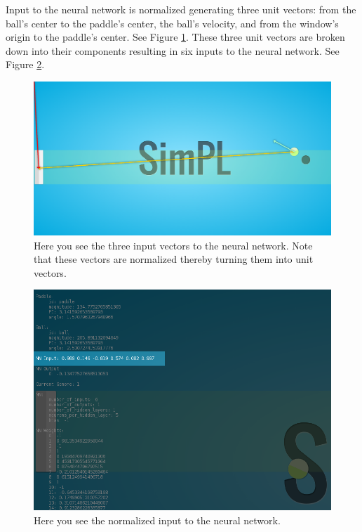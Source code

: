 \documentclass[a4paper,10pt]{article}
\begin{document}
Input to the neural network is normalized generating three unit vectors: from the ball's center to the paddle's center, the ball's velocity, and from the window's origin to the paddle's center. See Figure \ref{fig:unit_vectors}. These three unit vectors are broken down into their components resulting in six inputs to the neural network. See Figure \ref{fig:nn_input}. 

\begin{figure}[H]  
  \centering
  \includegraphics[width=1\textwidth]{figures/unit_vectors.png}
  \caption{Here you see the three input vectors to the neural network. Note that these vectors are normalized thereby turning them into unit vectors.}
  \label{fig:unit_vectors}
\end{figure}

\begin{figure}[H]  
  \centering
  \includegraphics[width=.9\textwidth]{figures/nn_input.png}
  \caption{Here you see the normalized input to the neural network.}
  \label{fig:nn_input}
\end{figure}
\end{document}
